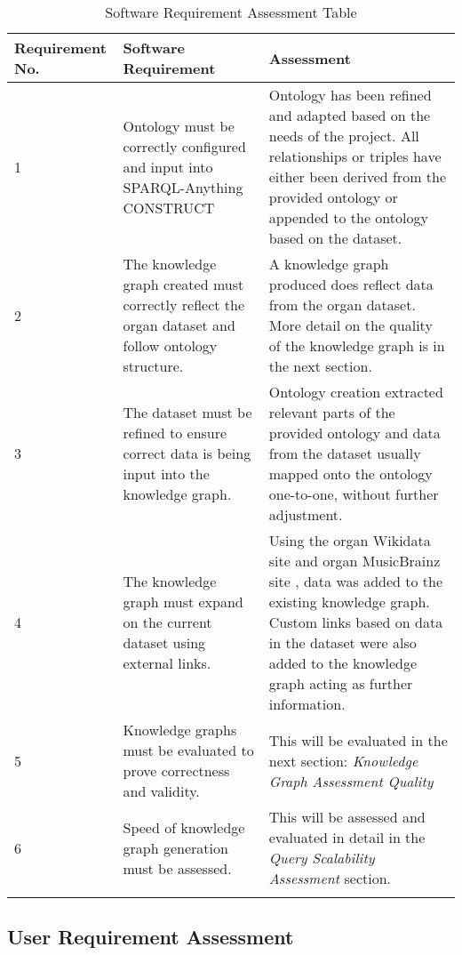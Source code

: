 \begin{longtable}{|p{2.25cm}|p{5.5cm}|p{5.5cm}|}

\hline
\textbf{Requirement No.} & \textbf{Software Requirement} & \textbf{Assessment}\\
\hline

1& 
Ontology must be correctly configured and input into SPARQL-Anything CONSTRUCT &
Ontology has been refined and adapted based on the needs of the project. All relationships or triples have either been derived from the provided ontology or appended to the ontology based on the dataset. \\
\hline

2&
The knowledge graph created must correctly reflect the organ dataset and follow ontology structure. &
A knowledge graph produced does reflect data from the organ dataset. More detail on the quality of the knowledge graph is in the next section. \\
\hline

3&
The dataset must be refined to ensure correct data is being input into the knowledge graph. &
Ontology creation extracted relevant parts of the provided ontology and data from the dataset usually mapped onto the ontology one-to-one, without further adjustment. \\
\hline

4&
The knowledge graph must expand on the current dataset using external links. &
Using the organ Wikidata site \cite{organwikidata} and organ MusicBrainz site \cite{organmusicbrainz}, data was added to the existing knowledge graph. Custom links based on data in the dataset were also added to the knowledge graph acting as further information. \\
\hline

5&
Knowledge graphs must be evaluated to prove correctness and validity. &
This will be evaluated in the next section: \textit{Knowledge Graph Assessment Quality} \\ 
\hline

6&
Speed of knowledge graph generation must be assessed. &
This will be assessed and evaluated in detail in the \textit{Query Scalability Assessment} section. \\ 
\hline
\caption{Software Requirement Assessment Table}
\end{longtable}

\subsection{User Requirement Assessment}

